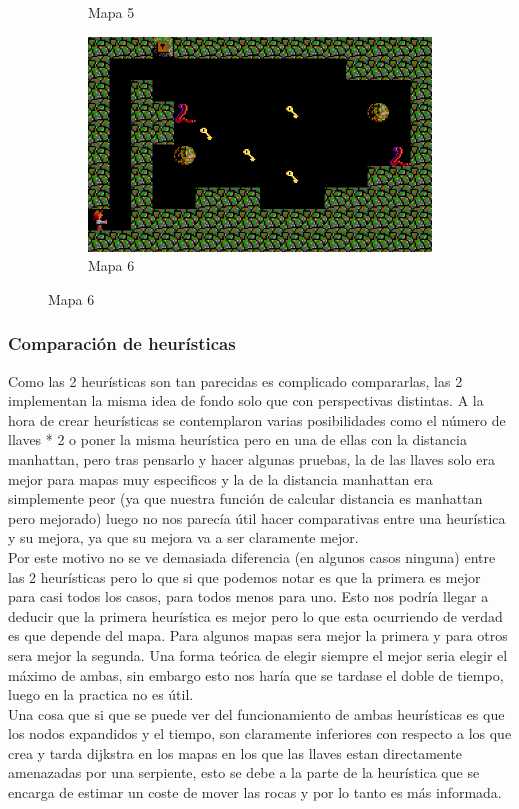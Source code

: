 \documentclass[11pt,spanish]{article}
\begin{document}
\begin{figure}[H]
\begin{subfigure}[b]{0.24\linewidth}
					\caption{Mapa 5}
				\end{subfigure}
				\begin{subfigure}[b]{0.39\linewidth}
					\includegraphics[width=\linewidth]{astar/lab6.png}
					\caption{Mapa 6}
				\end{subfigure}
			\end{figure}
			
		\subsubsection{Comparación de heurísticas}
			Como las 2 heurísticas son tan parecidas es complicado compararlas, las 2 implementan la misma idea de fondo solo que con perspectivas distintas. A la hora de crear heurísticas se contemplaron varias posibilidades como el número de llaves * 2 o poner la misma heurística pero en una de ellas con la distancia manhattan, pero tras pensarlo y hacer algunas pruebas, la de las llaves solo era mejor para mapas muy especificos y la de la distancia manhattan era simplemente peor (ya que nuestra función de calcular distancia es manhattan pero mejorado) luego no nos parecía útil hacer comparativas entre una heurística y su mejora, ya que su mejora va a ser claramente mejor.\\
			Por este motivo no se ve demasiada diferencia (en algunos casos ninguna) entre las 2 heurísticas pero lo que si que podemos notar es que la primera es mejor para casi todos los casos, para todos menos para uno. Esto nos podría llegar a deducir que la primera heurística es mejor pero lo que esta ocurriendo de verdad es que depende del mapa. Para algunos mapas sera mejor la primera y para otros sera mejor la segunda. Una forma teórica de elegir siempre el mejor seria elegir el máximo de ambas, sin embargo esto nos haría que se tardase el doble de tiempo, luego en la practica no es útil.\\
			Una cosa que si que se puede ver del funcionamiento de ambas heurísticas es que los nodos expandidos y el tiempo, son claramente inferiores con respecto a los que crea y tarda dijkstra en los mapas en los que las llaves estan directamente amenazadas por una serpiente, esto se debe a la parte de la heurística que se encarga de estimar un coste de mover las rocas y por lo tanto es más informada.
\end{document}
